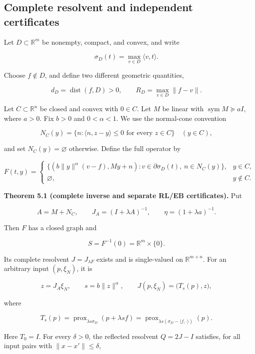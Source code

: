 \documentclass[11pt,a4paper]{article}
\theoremstyle{plain}
\theoremstyle{definition}
\theoremstyle{remark}
\begin{document}
\hypertarget{complete-resolvent-and-independent-certificates}{%
\subsection{Complete resolvent and independent
certificates}\label{complete-resolvent-and-independent-certificates}}

Let \(D\subset\mathbb R^m\) be nonempty, compact, and convex, and write

\[
\sigma_D(t)=\max_{v\in D}\langle v,t\rangle.
\]

Choose \(f\notin D\), and define two different geometric quantities,

\[
d_D=\operatorname{dist}(f,D)>0,
\qquad
R_D=\max_{v\in D}\|f-v\|.
\tag{5.1}
\]

Let \(C\subset\mathbb R^n\) be closed and convex with \(0\in C\). Let
\(M\) be linear with \(\operatorname{sym}M\succeq aI\), where \(a>0\).
Fix \(b>0\) and \(0<\alpha<1\). We use the normal-cone convention

\[
N_C(y)=\{n:\langle n,z-y\rangle\le0\text{ for every }z\in C\}
\quad(y\in C),
\]

and set \(N_C(y)=\varnothing\) otherwise. Define the full operator by

\[
F(t,y)=
\begin{cases}
\{(b\|y\|^\alpha(v-f),My+n):
v\in\partial\sigma_D(t),\ n\in N_C(y)\},&y\in C,\\
\varnothing,&y\notin C.
\end{cases}
\tag{5.2}
\]

\textbf{Theorem 5.1 (complete inverse and separate RL/EB certificates).}
Put

\[
A=M+N_C,\qquad J_A=(I+\lambda A)^{-1},
\qquad\eta=(1+\lambda a)^{-1}.
\tag{5.3}
\]

Then \(F\) has a closed graph and

\[
S=F^{-1}(0)=\mathbb R^m\times\{0\}.
\tag{5.4}
\]

Its complete resolvent \(J=J_{\lambda F}\) exists and is single-valued
on \(\mathbb R^{m+n}\). For an arbitrary input \((p,\xi_N)\), it is

\[
z=J_A\xi_N,\qquad s=b\|z\|^\alpha,
\qquad
J(p,\xi_N)=\bigl(T_s(p),z\bigr),
\tag{5.5}
\]

where

\[
T_s(p)=\operatorname{prox}_{\lambda s\sigma_D}(p+\lambda sf)
=\operatorname{prox}_{\lambda s(\sigma_D-\langle f,\cdot\rangle)}(p).
\tag{5.6}
\]

Here \(T_0=I\). For every \(\delta>0\), the reflected resolvent
\(Q=2J-I\) satisfies, for all input pairs with \(\|x-x'\|\le\delta\),
\end{document}
